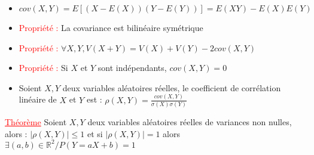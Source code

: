 \documentclass[a4paper, 11pt, french]{article}
\newcommand{\R}{\mathbb{R}}
\newcommand{\si}{\sigma}
\newcommand{\thm}{\textcolor{red}{\underline{Théorème} }}
\newcommand{\ppt}{\textcolor{red}{Propriété : }}
\begin{document}
	\begin{itemize}
 		\item $cov(X,Y)=E[(X-E(X))(Y-E(Y))]=E(XY)-E(X)E(Y)$
 		\item \ppt La covariance est bilinéaire symétrique
		\item \ppt $\forall X,Y, V(X+Y)=V(X)+V(Y)-2cov(X,Y)$
		\item \ppt Si $X$ et $Y$ sont indépendants, $cov(X,Y)=0$
		\item Soient $X,Y$ deux variables aléatoires réelles, le coefficient de corrélation linéaire de $X$ et $Y$ est : $\rho(X,Y)=\frac{cov(X,Y)}{\si(X)\si(Y)}$
	\end{itemize}
	 \thm  Soient $X,Y$ deux variables aléatoires réelles de variances non nulles, alors : ${|\rho(X,Y)|\leqslant1}$ et si $|\rho(X,Y)|=1$ alors $\exists  (a,b) \in \R^2 / P(Y=aX+b)=1$
\end{document}
